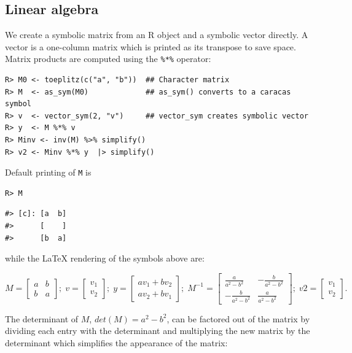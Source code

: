 \hypertarget{linear-algebra}{%
\subsection{Linear algebra}\label{linear-algebra}}

We create a symbolic matrix from an R object and a symbolic
vector directly. A vector is a one-column matrix which is printed as
its transpose to save space. Matrix products are computed using the
\texttt{\%*\%} operator:

\begin{verbatim}
R> M0 <- toeplitz(c("a", "b"))  ## Character matrix
R> M  <- as_sym(M0)             ## as_sym() converts to a caracas symbol
R> v  <- vector_sym(2, "v")     ## vector_sym creates symbolic vector
R> y  <- M %*% v
R> Minv <- inv(M) %>% simplify()
R> v2 <- Minv %*% y  |> simplify()
\end{verbatim}

Default printing of \texttt{M} is

\begin{verbatim}
R> M
\end{verbatim}

\begin{verbatim}
#> [c]: [a  b]
#>      [    ]
#>      [b  a]
\end{verbatim}

while the LaTeX rendering of the symbols above are:

\[
M = \left[\begin{matrix}a & b\\b & a\end{matrix}\right]; \; 
v = \left[\begin{matrix}v_{1}\\v_{2}\end{matrix}\right]; \;
y = \left[\begin{matrix}a v_{1} + b v_{2}\\a v_{2} + b v_{1}\end{matrix}\right]; \;
M^{-1} = \left[\begin{matrix}\frac{a}{a^{2} - b^{2}} & - \frac{b}{a^{2} - b^{2}}\\- \frac{b}{a^{2} - b^{2}} & \frac{a}{a^{2} - b^{2}}\end{matrix}\right]; \;
v2 = \left[\begin{matrix}v_{1}\\v_{2}\end{matrix}\right] . 
\]

The determinant of \(M\), \(det(M)=a^2 - b^2\), can be factored out of
the matrix by dividing each entry with the determinant and multiplying
the new matrix by the determinant which simplifies the appearance of
the matrix:

